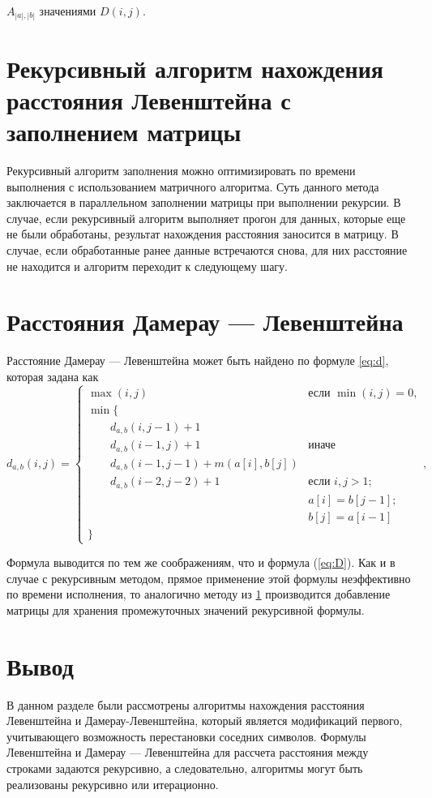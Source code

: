 \documentclass[12pt]{report}
\begin{document}
$A_{|a|,|b|}$ значениями $D(i, j)$.


\section{Рекурсивный алгоритм нахождения расстояния Левенштейна с заполнением матрицы}

\label{sec:recmat}


Рекурсивный алгоритм заполнения можно оптимизировать по времени выполнения с использованием матричного алгоритма. Суть данного метода заключается в параллельном заполнении матрицы при выполнении рекурсии. В случае, если рекурсивный алгоритм выполняет прогон для данных, которые еще не были обработаны, результат нахождения расстояния заносится в матрицу. В случае, если обработанные ранее данные встречаются снова, для них расстояние не находится и алгоритм переходит к следующему шагу.


\section{Расстояния Дамерау — Левенштейна}

Расстояние Дамерау — Левенштейна может быть найдено по формуле \ref{eq:d}, которая задана как
\begin{equation}
\label{eq:d}
d_{a,b}(i, j) = \begin{cases}
\max(i, j) &\text{если }\min(i, j) = 0,\\
\min \lbrace \\
\qquad d_{a,b}(i, j-1) + 1\\
\qquad d_{a,b}(i-1, j) + 1 &\text{иначе}\\
\qquad d_{a,b}(i-1, j-1) + m(a[i], b[j])\\
\qquad d_{a,b}(i-2, j-2) + 1 &\text{если }i,j > 1;\\
\qquad &\text{}a[i] = b[j-1]; \\
\qquad &\text{}b[j] = a[i-1]\\
\rbrace
\end{cases},
\end{equation}

Формула выводится по тем же соображениям, что и формула (\ref{eq:D}).
Как и в случае с рекурсивным методом, прямое применение этой формулы неэффективно по времени исполнения, то аналогично методу из \ref{sec:recmat} производится добавление матрицы для хранения промежуточных значений рекурсивной формулы.

\section{Вывод}
	В данном разделе были рассмотрены алгоритмы нахождения расстояния Левенштейна и Дамерау-Левенштейна, который является модификаций первого, учитывающего возможность перестановки соседних символов. Формулы Левенштейна и Дамерау — Левенштейна для рассчета расстояния между строками задаются рекурсивно, а следовательно, алгоритмы могут быть реализованы рекурсивно или итерационно.
	
\end{document}
